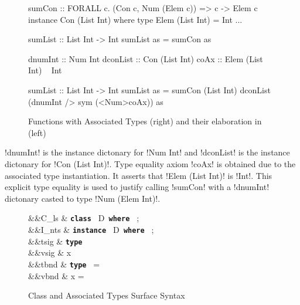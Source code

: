 \documentclass[screen,nonacm,manuscript,review]{acmart} %
\begin{document}
\begin{figure}[ht]
  \centering
\begin{minipage}[ht]{0.5\linewidth}
\begin{CenteredBox}
\begin{code}
sumCon :: FORALL c. (Con c, Num (Elem c))
       => c -> Elem c
instance Con (List Int) where
  type Elem (List Int) = Int
  ...

sumList :: List Int -> Int
sumList as = sumCon as
\end{code}
\end{CenteredBox}
\end{minipage}%
\begin{minipage}[ht]{0.5\linewidth}
\begin{CenteredBox}
\begin{code}


dnumInt :: Num Int
dconList :: Con (List Int)
coAx :: Elem (List Int) ~ Int


sumList :: List Int -> Int
sumList as = sumCon (List Int) dconList
                    (dnumInt /> sym (<Num>coAx)) as
\end{code}
\end{CenteredBox}
\end{minipage}
\caption{Functions with Associated Types (right) and their elaboration in \SFC (left)}
\label{fig:sfc-assoc-type}
\end{figure}

!dnumInt! is the instance dictonary for !Num Int!
and !dconList! is the instance dictonary for !Con (List Int)!.
Type equality axiom !coAx! is obtained due to the associated
type instantiation. It asserts that !Elem (List Int)! is !Int!.
This explicit type equality is used to justify calling !sumCon!
with a !dnumInt! dictonary casted to type !Num (Elem Int)!.

\begin{figure}[ht]
 \centering
 \begin{syntax}
  &&C_{ls} \bnfeq& \textbf{\texttt{class }} D\App\many\TyVar \textbf{\texttt{ where }} ; \\
  &&I_{nts} \bnfeq& \textbf{\texttt{instance }} D\App\many\tau \textbf{\texttt{ where }} ; \\
  &&tsig \bnfeq& \textbf{\texttt{type }} \tau\\
  &&vsig \bnfeq& x\co\tau\\
  &&tbnd \bnfeq& \textbf{\texttt{type }} \tau = \sigma\\
  &&vbnd \bnfeq& x = \Tm
 \end{syntax}
 \caption[Class Syntax]{Class and Associated Types Surface Syntax}
 \label{fig:assoc-types-syntax}
\end{figure}
\end{document}
